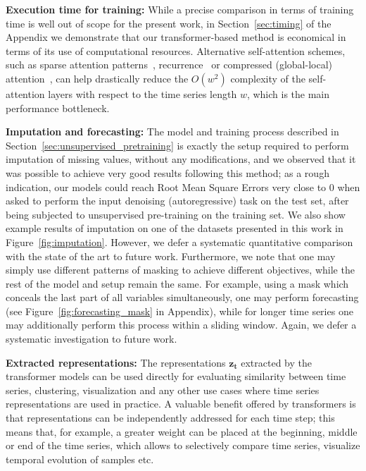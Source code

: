 \documentclass{article} \usepackage{iclr2021_conference,times}
\begin{document}
\textbf{Execution time for training:} While a precise comparison in terms of training time is well out of scope for the present work, in Section~\ref{sec:timing} of the Appendix we demonstrate that our transformer-based method is economical in terms of its use of computational resources. Alternative self-attention schemes, such as sparse attention patterns~\citep{li2019enhancing}, recurrence~\citep{dai_transformer-xl_2019} or compressed (global-local) attention~\citep{beltagy_longformer_2020}, can help drastically reduce the $O(w^2)$ complexity of the self-attention layers with respect to the time series length $w$, which is the main performance bottleneck.

\textbf{Imputation and forecasting:} The model and training process described in Section~\ref{sec:unsupervised_pretraining} is exactly the setup required to perform imputation of missing values, without any modifications, and we observed that it was possible to achieve very good results following this method; as a rough indication, our models could reach Root Mean Square Errors very close to 0 when asked to perform the input denoising (autoregressive) task on the test set, after being subjected to unsupervised pre-training on the training set. We also show example results of imputation on one of the datasets presented in this work in Figure~\ref{fig:imputation}. However, we defer a systematic quantitative comparison with the state of the art to future work. Furthermore, we note that one may simply use different patterns of masking to achieve different objectives, while the rest of the model and setup remain the same. For example, using a mask which conceals the last part of all variables simultaneously, one may perform forecasting (see Figure~\ref{fig:forecasting_mask} in Appendix), while for longer time series one may additionally perform this process within a sliding window. Again, we defer a systematic investigation to future work.

\textbf{Extracted representations:} The representations  $\mathbf{z_t}$ extracted by the transformer models can be used directly for evaluating similarity between time series, clustering, visualization and any other use cases where time series representations are used in practice. A valuable benefit offered by transformers is that representations can be independently addressed for each time step; this means that, for example, a greater weight can be placed at the beginning, middle or end of the time series, which allows to selectively compare time series, visualize temporal evolution of samples etc.
\end{document}
